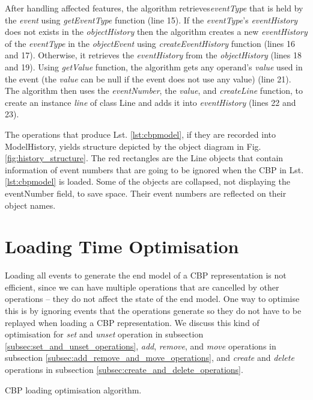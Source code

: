 \documentclass{llncs}
\begin{document}
After handling affected features, the algorithm retrieves\emph{eventType} that is held by the \emph{event} using \emph{getEventType} function (line 15). If the \emph{eventType}'s \emph{eventHistory} does not exists in the \emph{objectHistory} then the algorithm creates a new \emph{eventHistory} of the \emph{eventType} in the \emph{objectEvent}  using \emph{createEventHistory} function (lines 16 and 17). Otherwise, it retrieves the \emph{eventHistory} from the \emph{objectHistory} (lines 18 and 19). Using \emph{getValue} function, the algorithm gets any operand's \emph{value} used in the event (the \emph{value} can be null if the event does not use any value) (line 21). The algorithm then uses the \emph{eventNumber}, the \emph{value}, and \emph{createLine} function, to create an instance \emph{line} of class Line and adds it into \emph{eventHistory} (lines 22 and 23).   

The operations that produce Lst. \ref{lst:cbpmodel}, if they are recorded into ModelHistory, yields structure depicted by the object diagram in Fig. \ref{fig:history_structure}. The red rectangles are the Line objects that contain information of event numbers that are going to be ignored when the CBP in Lst. \ref{lst:cbpmodel} is loaded. Some of the objects are collapsed, not displaying the eventNumber field, to save space. Their event numbers are reflected on their object names.  

\section{Loading Time Optimisation}
\label{sec:loading_time_optimisation}
Loading all events to generate the end model of a CBP representation is not efficient, since we can have multiple operations that are cancelled by other operations -- they do not affect the state of the end model. One way to optimise this is by ignoring events that the operations generate so they do not have to be replayed when loading a CBP representation. We discuss this kind of optimisation for \emph{set} and \emph{unset} operation in subsection \ref{subsec:set_and_unset_operations}, \emph{add}, \emph{remove}, and \emph{move} operations in subsection \ref{subsec:add_remove_and_move_operations}, and \emph{create} and \emph{delete} operations in subsection \ref{subsec:create_and_delete_operations}.

\begin{algorithm}
\begin{small}
\end{small}
\caption{CBP loading optimisation algorithm.}
\label{alg:optimised_load}
\end{algorithm}
\end{document}
